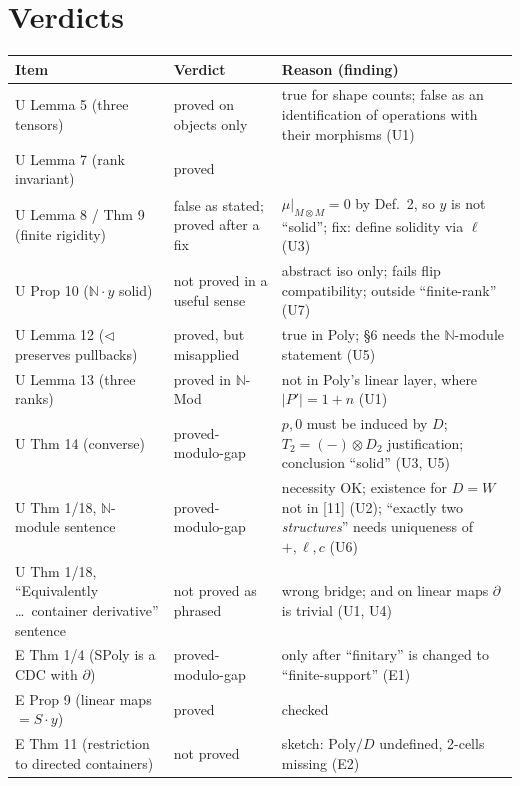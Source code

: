 \documentclass[11pt]{article}
\newcommand{\tri}{\mathbin{\triangleleft}}
\newcommand{\N}{\mathbb{N}}
\begin{document}
\section*{Verdicts}
\begin{center}\small
\begin{tabular}{p{5.2cm}p{2.9cm}p{7.2cm}}
\toprule
Item & Verdict & Reason (finding)\\\midrule
U Lemma 5 (three tensors) & proved on objects only & true for shape counts; false as an identification of operations with their morphisms (U1)\\
U Lemma 7 (rank invariant) & proved & \\
U Lemma 8 / Thm 9 (finite rigidity) & false as stated; proved after a fix & $\mu|_{M\otimes M}=0$ by Def.~2, so $y$ is not ``solid''; fix: define solidity via $\ell$ (U3)\\
U Prop 10 ($\N\cdot y$ solid) & not proved in a useful sense & abstract iso only; fails flip compatibility; outside ``finite-rank'' (U7)\\
U Lemma 12 ($\tri$ preserves pullbacks) & proved, but misapplied & true in Poly; \S6 needs the $\N$-module statement (U5)\\
U Lemma 13 (three ranks) & proved in $\N$-Mod & not in Poly's linear layer, where $|P'|=1+n$ (U1)\\
U Thm 14 (converse) & proved-modulo-gap & $p,0$ must be induced by $D$; $T_2=(-)\otimes D_2$ justification; conclusion ``solid'' (U3, U5)\\
U Thm 1/18, $\N$-module sentence & proved-modulo-gap & necessity OK; existence for $D=W$ not in [11] (U2); ``exactly two \emph{structures}'' needs uniqueness of $+,\ell,c$ (U6)\\
U Thm 1/18, ``Equivalently \dots\ container derivative'' sentence & not proved as phrased & wrong bridge; and on linear maps $\partial$ is trivial (U1, U4)\\
E Thm 1/4 (SPoly is a CDC with $\partial$) & proved-modulo-gap & only after ``finitary'' is changed to ``finite-support'' (E1)\\
E Prop 9 (linear maps $=S\cdot y$) & proved & checked\\
E Thm 11 (restriction to directed containers) & not proved & sketch: $\mathrm{Poly}/D$ undefined, 2-cells missing (E2)\\
\bottomrule
\end{tabular}
\end{center}
\end{document}
